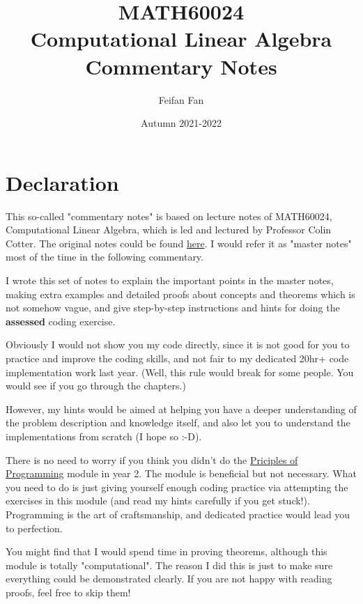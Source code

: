 \documentclass[a4paper,11pt,twoside]{report}
\begin{document}
\title{MATH60024 \\ Computational Linear Algebra \\
Commentary Notes}
\date{Autumn 2021-2022}
\author{Feifan Fan}




\maketitle
\chapter*{Declaration}
This so-called "commentary notes" is based on lecture notes of MATH60024, Computational Linear Algebra, which is led and lectured by Professor Colin Cotter. 
The original notes could be found \href{https://comp-lin-alg.github.io}{here}. I would refer it as "master notes" most of the time in the following commentary.

I wrote this set of notes to explain the important points in the master notes, making extra examples and detailed proofs about concepts and theorems which is not somehow vague, and give step-by-step instructions and hints for doing the \textbf{assessed} coding exercise.

Obviously I would not show you my code directly, since it is not good for you to practice and improve the coding skills, and not fair to my dedicated 20hr+ code implementation work last year. (Well, this rule would break for some people. You would see if you go through the chapters.)

However, my hints would be aimed at helping you have a deeper understanding of the problem description and knowledge itself, and also let you to understand the implementations from scratch (I hope so :-D).

There is no need to worry if you think you didn't do the \href{https://object-oriented-python.github.io}{Priciples of Programming} module in year 2. The module is beneficial but not necessary. What you need to do is just giving yourself enough coding practice via attempting the exercises in this module (and read my hints carefully if you get stuck!). Programming is the art of craftsmanship, and dedicated practice would lead you to perfection.


You might find that I would spend time in proving theorems, although this module is totally "computational". The reason I did this is just to make sure everything could be demonstrated clearly. If you are not happy with reading proofs, feel free to skip them!
\end{document}
